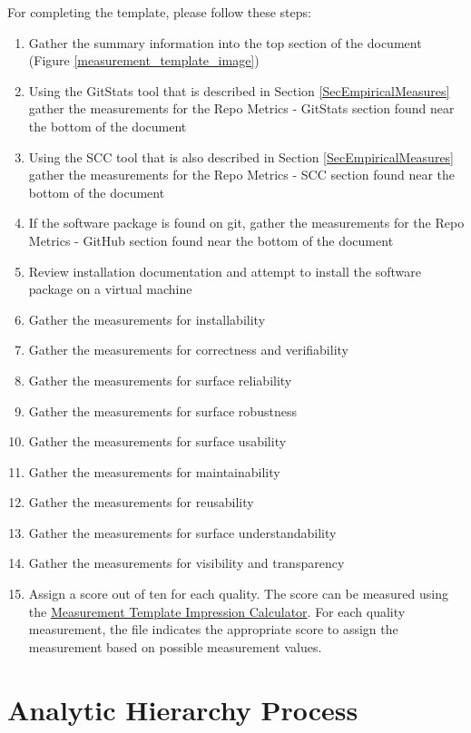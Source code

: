 \documentclass[letterpaper,cleveref]{lipics-v2019}
\theoremstyle{definition}
\begin{document}
For completing the template, please follow these steps:

\begin{enumerate}
\item Gather the summary information into the top section of the document
  (Figure \ref{measurement_template_image})
\item Using the GitStats tool that is described in Section
  \ref{SecEmpiricalMeasures} gather the measurements for the Repo Metrics -
  GitStats section found near the bottom of the document
\item Using the SCC tool that is also described in Section
  \ref{SecEmpiricalMeasures} gather the measurements for the Repo Metrics - SCC
  section found near the bottom of the document
\item If the software package is found on git, gather the measurements for the
  Repo Metrics - GitHub section found near the bottom of the document
\item Review installation documentation and attempt to install the software
  package on a virtual machine
\item Gather the measurements for installability
\item Gather the measurements for correctness and verifiability
\item Gather the measurements for surface reliability
\item Gather the measurements for surface robustness
\item Gather the measurements for surface usability
\item Gather the measurements for maintainability
\item Gather the measurements for reusability
\item Gather the measurements for surface understandability
\item Gather the measurements for visibility and transparency
\item Assign a score out of ten for each quality. The score can be measured
  using the
  \href{https://github.com/smiths/AIMSS/blob/master/StateOfPractice/Methodology/MeasurementTemplate_ImpressionCalculator.xlsx}
  {Measurement Template Impression Calculator}. For each quality measurement,
  the file indicates the appropriate score to assign the measurement based on
  possible measurement values.
\end{enumerate}

\section{Analytic Hierarchy Process} \label{SecAHP}
\end{document}
